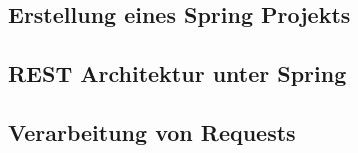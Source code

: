 \subsection{Erstellung eines Spring Projekts}
  \label{Erstellung eines Spring Projekts}
  
\pagebreak

\subsection{REST Architektur unter Spring}
  \label{REST Architektur unter Spring}
  
\pagebreak

\subsection{Verarbeitung von Requests}
  \label{Verarbeitung von Requests}
  
\pagebreak